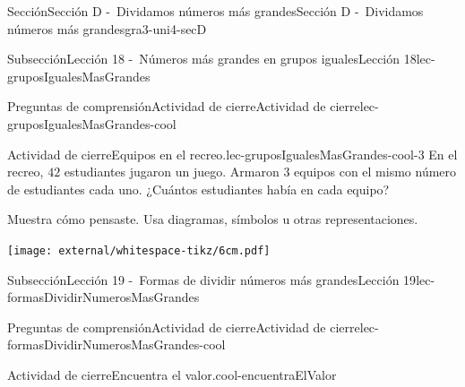 \begin{sectionptx}{Sección}{Sección D -~Dividamos números más grandes}{}{Sección D -~Dividamos números más grandes}{}{}{gra3-uni4-secD}
%
%
\typeout{************************************************}
\typeout{************************************************}
%
\begin{subsectionptx}{Subsección}{Lección 18 -~Números más grandes en grupos iguales}{}{Lección 18}{}{}{lec-gruposIgualesMasGrandes}
%
%
\typeout{************************************************}
\typeout{************************************************}
%
\begin{reading-questions-subsubsection-numberless}{Preguntas de comprensión}{Actividad de cierre}{}{Actividad de cierre}{}{}{lec-gruposIgualesMasGrandes-cool}
\begin{project}{Actividad de cierre}{Equipos en el recreo.}{lec-gruposIgualesMasGrandes-cool-3}%
En el recreo, \(42\) estudiantes jugaron un juego. Armaron \(3\) equipos con el mismo número de estudiantes cada uno. ¿Cuántos estudiantes había en cada equipo?%
\par
Muestra cómo pensaste. Usa diagramas, símbolos u otras representaciones.%
\begin{image}{0}{1}{0}{}%
\texttt{[image: external/whitespace-tikz/6cm.pdf]}
\end{image}%
\end{project}%
\end{reading-questions-subsubsection-numberless}
\end{subsectionptx}
%
%
\typeout{************************************************}
\typeout{************************************************}
%
\begin{subsectionptx}{Subsección}{Lección 19 -~Formas de dividir números más grandes}{}{Lección 19}{}{}{lec-formasDividirNumerosMasGrandes}
%
%
\typeout{************************************************}
\typeout{************************************************}
%
\begin{reading-questions-subsubsection-numberless}{Preguntas de comprensión}{Actividad de cierre}{}{Actividad de cierre}{}{}{lec-formasDividirNumerosMasGrandes-cool}
\begin{project}{Actividad de cierre}{Encuentra el valor.}{cool-encuentraElValor}%

\end{project}
\end{reading-questions-subsubsection-numberless}
\end{subsectionptx}
\end{sectionptx}
